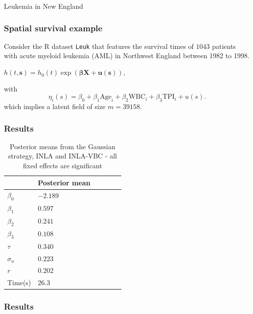 \documentclass[11pt,
compress,
]{beamer}
\begin{document}
\begin{frame}
\huge{Leukemia in New England}
\end{frame}
\begin{frame}
\frametitle{Spatial survival example}
Consider the R dataset \texttt{Leuk} that features the survival times
of $1043$ patients with acute myeloid leukemia (AML) in Northwest
England between 1982 to 1998.

\begin{center}
	$h(t,\pmb s) = h_0(t) \exp (\pmb\beta\pmb X + \pmb u(\pmb s)),$
\end{center}
with 
\begin{equation*}
	\eta_i(s) = \beta_0 + \beta_1\text{Age}_i + \beta_2\text{WBC}_i + \beta_3\text{TPI}_i + u(s).
\end{equation*}
which implies a latent field of size
$m = 39158$.
\end{frame}
\begin{frame}
\end{frame}

\begin{frame}
\frametitle{Results}
\begin{table}[h]
	\centering
	\begin{tabular}{|l||l|l|l|l|l|}
		\hline
		& Posterior mean   \\ \hline \hline
		$\beta_0$ & $-2.189$  \\ \hline
		$\beta_1$ & $0.597$   \\  \hline
		$\beta_2$ & $0.241$  \\ \hline
		$\beta_3$ & $0.108$  \\ \hline
		$\tau$ & $0.340$ \\ \hline
		$\sigma_u$& $0.223$  \\ \hline
		$r$ & $0.202$  \\ \hline
		Time(s) & $26.3$  \\ \hline
	\end{tabular}
	\caption{Posterior means from the Gaussian strategy, INLA and INLA-VBC -
		all fixed effects are significant}
	\label{table:leuk}
\end{table}
\end{frame}

\begin{frame}
\frametitle{Results}
\end{frame}
\end{document}
